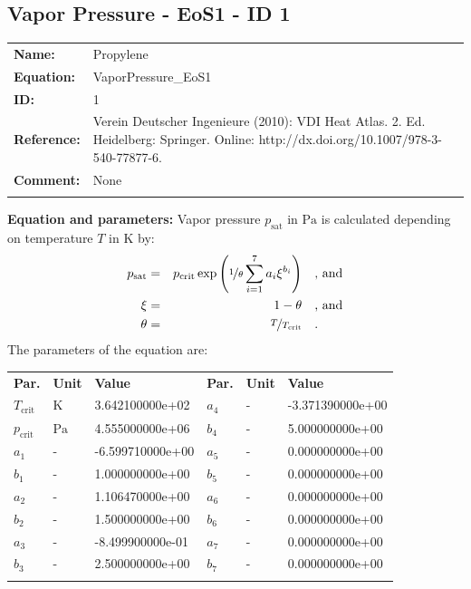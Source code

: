 \FloatBarrier
\newpage
\subsection{Vapor Pressure - EoS1 - ID 1}
%
\begin{tabular}[l]{|lp{11.5cm}|}
\hline
\addlinespace

\textbf{Name:} & Propylene \\
\textbf{Equation:} & VaporPressure\_EoS1 \\
\textbf{ID:} & 1 \\
\textbf{Reference:} & Verein Deutscher Ingenieure (2010): VDI Heat Atlas. 2. Ed. Heidelberg: Springer. Online: http://dx.doi.org/10.1007/978-3-540-77877-6. \\
\textbf{Comment:} & None \\

\addlinespace
\hline
\end{tabular}
\newline

\textbf{Equation and parameters:}
\newline
%
Vapor pressure $p_\mathrm{sat}$ in $\si{\pascal}$ is calculated depending on temperature $T$ in $\si{\kelvin}$ by:
%
\begin{equation*}
\begin{split}
p_\mathrm{sat} &=& p_\mathrm{crit} \exp \left( \nicefrac{1}{\theta} \sum_{i=1}^{7} a_i \xi^{b_i} \right) & \quad\text{, and} \\
\xi &=& 1 - \theta & \quad\text{, and} \\
\theta &=& \nicefrac{T}{T_\mathrm{crit}} & \quad\text{.}
\end{split}
\end{equation*}
%
The parameters of the equation are:
%
\begin{longtable}[l]{lll|lll}
\toprule
\addlinespace
\textbf{Par.} & \textbf{Unit} & \textbf{Value} &	\textbf{Par.} & \textbf{Unit} & \textbf{Value} \\
\addlinespace
\midrule
\endhead

\bottomrule
\endfoot
\bottomrule
\endlastfoot
\addlinespace

$T_\mathrm{crit}$ & $\si{\kelvin}$ & 3.642100000e+02 & $a_4$ & - & -3.371390000e+00 \\
$p_\mathrm{crit}$ & $\si{\pascal}$ & 4.555000000e+06 & $b_4$ & - & 5.000000000e+00 \\
$a_1$ & - & -6.599710000e+00 & $a_5$ & - & 0.000000000e+00 \\
$b_1$ & - & 1.000000000e+00 & $b_5$ & - & 0.000000000e+00 \\
$a_2$ & - & 1.106470000e+00 & $a_6$ & - & 0.000000000e+00 \\
$b_2$ & - & 1.500000000e+00 & $b_6$ & - & 0.000000000e+00 \\
$a_3$ & - & -8.499900000e-01 & $a_7$ & - & 0.000000000e+00 \\
$b_3$ & - & 2.500000000e+00 & $b_7$ & - & 0.000000000e+00 \\

\addlinespace\end{longtable}

